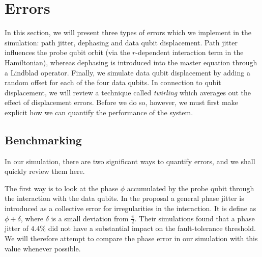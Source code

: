 \section{Errors} \label{sec:errors}
In this section, we will present three types of errors which we implement in the simulation: path jitter, dephasing and data qubit displacement. Path jitter influences the probe qubit orbit (via the $r$-dependent interaction term in the Hamiltonian), whereas dephasing is introduced into the master equation through a Lindblad operator. Finally, we simulate data qubit displacement by adding a random offset for each of the four data qubits. In connection to qubit displacement, we will review a technique called \emph{twirling} which averages out the effect of displacement errors. Before we do so, however, we must first make explicit how we can quantify the performance of the system. 

\subsection{Benchmarking}
In our simulation, there are two significant ways to quantify errors, and we shall quickly review them here.

The first way is to look at the phase $\phi$ accumulated by the probe qubit through the interaction with the data qubits. In the proposal \citet{OGorman2016} a general phase jitter is introduced as a collective error for irregularities in the interaction. It is define as $\phi + \delta$, where $\delta$ is a small deviation from $\frac{\pi}{2}$.  Their simulations found that a phase jitter of $4.4 \%$ did not have a substantial impact on the fault-tolerance threshold. We will therefore attempt to compare the phase error in our simulation with this value whenever possible. %

